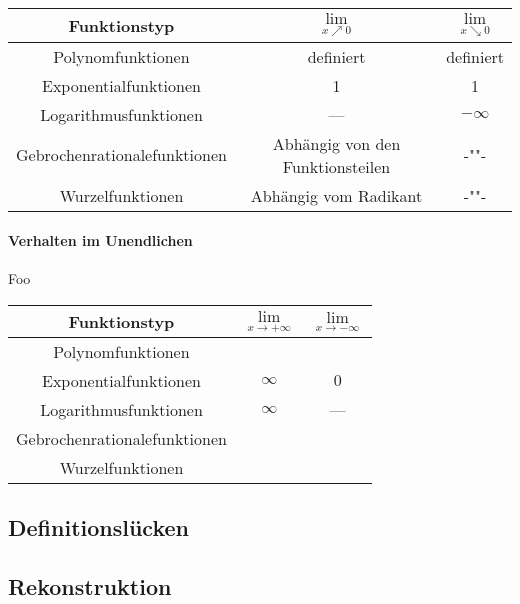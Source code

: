 \documentclass{article}
\begin{document}
		\begin{tabular}{|c|c|c|}
			\hline 
			Funktionstyp & $\lim\limits_{x \nearrow 0}$& $\lim\limits_{x \searrow 0}$ \\
			\hline
			Polynomfunktionen & definiert & definiert \\
			\hline
			Exponentialfunktionen & 1 & 1 \\
			\hline
			Logarithmusfunktionen & --- & $- \infty$ \\
			\hline
			Gebrochenrationalefunktionen & Abhängig von den Funktionsteilen  & -""-\\
			\hline
			Wurzelfunktionen & Abhängig vom Radikant & -""- \\ 
			\hline
		\end{tabular}
		 
		
		\paragraph{Verhalten im Unendlichen}\label{Verhalten Im unendlichen}
			Foo\\
		
				\begin{tabular}{|c|c|c|}
			\hline 
			Funktionstyp & $\lim\limits_{x \rightarrow + \infty}$& $\lim\limits_{x \rightarrow - \infty}$ \\
			\hline
			Polynomfunktionen & & \\
			\hline
			Exponentialfunktionen & $\infty$ & $0$ \\
			\hline
			Logarithmusfunktionen & $\infty$ & --- \\
			\hline
			Gebrochenrationalefunktionen & & \\
			\hline
			Wurzelfunktionen & & \\ 
			\hline
		\end{tabular}
		
	\subsection{Definitionslücken}\label{Definitionslücke}
	
	\subsection{Rekonstruktion}\label{Rekonstruktion}
\end{document}

